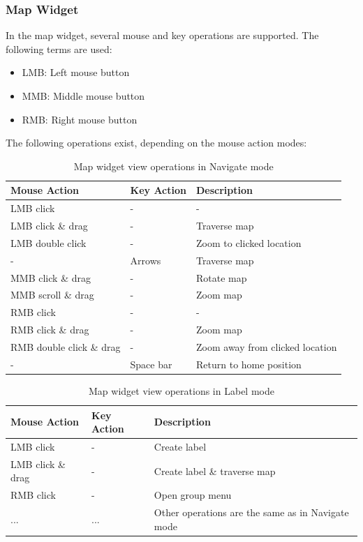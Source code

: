 \subsubsection{Map Widget}
\label{sec:osgview_map}

In the map widget, several mouse and key operations are supported. The following terms are used:

\begin{itemize}
 \item LMB: Left mouse button
 \item MMB: Middle mouse button
 \item RMB: Right mouse button
\end{itemize}

The following operations exist, depending on the mouse action modes:

\begin{table}[H]
  \center
  \begin{tabular}{ | l | l | l |}
    \hline
    \textbf{Mouse Action} & \textbf{Key Action} &  \textbf{Description} \\ \hline
    LMB click & - & - \\ \hline
    LMB click \& drag & - & Traverse map \\ \hline
    LMB double click & - & Zoom to clicked location \\ \hline
    - & Arrows & Traverse map \\ \hline
    MMB click \& drag & - & Rotate map \\ \hline
    MMB scroll \& drag & - & Zoom map \\ \hline
    RMB click & - & - \\ \hline
    RMB click \& drag & - & Zoom map \\ \hline
    RMB double click \& drag & - & Zoom away from clicked location \\ \hline
    - & Space bar & Return to home position \\ \hline
  \end{tabular}
  \caption{Map widget view operations in Navigate mode}
\end{table}

\begin{table}[H]
  \center
  \begin{tabular}{ | l | l | l |}
    \hline
    \textbf{Mouse Action} & \textbf{Key Action} &  \textbf{Description} \\ \hline
    LMB click & - & Create label \\ \hline
    LMB click \& drag & - & Create label \& traverse map \\ \hline
    RMB click & - & Open group menu \\ \hline
    ... & ... & Other operations are the same as in Navigate mode \\ \hline
  \end{tabular}
  \caption{Map widget view operations in Label mode}
\end{table}

